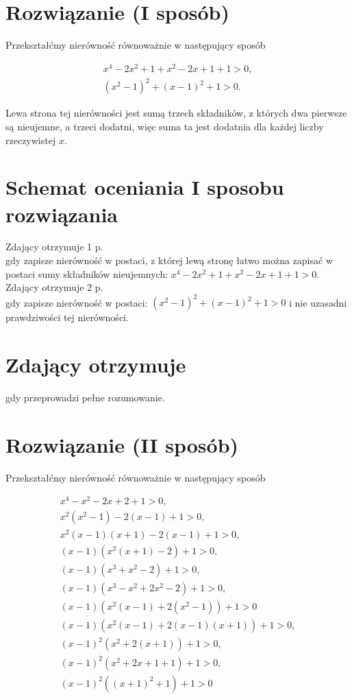 \documentclass[10pt]{article}
\begin{document}
\section*{Rozwiązanie (I sposób)}
Przekształćmy nierówność równoważnie w następujący sposób

$$
\begin{gathered}
x^{4}-2 x^{2}+1+x^{2}-2 x+1+1>0, \\
\left(x^{2}-1\right)^{2}+(x-1)^{2}+1>0 .
\end{gathered}
$$

Lewa strona tej nierówności jest sumą trzech składników, z których dwa pierwsze są nieujemne, a trzeci dodatni, więc suma ta jest dodatnia dla każdej liczby rzeczywistej $x$.

\section*{Schemat oceniania I sposobu rozwiązania}
Zdający otrzymuje 1 p.\\
gdy zapisze nierówność w postaci, z której lewą stronę łatwo można zapisać w postaci sumy składników nieujemnych: $x^{4}-2 x^{2}+1+x^{2}-2 x+1+1>0$.\\
Zdający otrzymuje 2 p.\\
gdy zapisze nierówność w postaci: $\left(x^{2}-1\right)^{2}+(x-1)^{2}+1>0$ i nie uzasadni prawdziwości tej nierówności.

\section*{Zdający otrzymuje}
gdy przeprowadzi pełne rozumowanie.

\section*{Rozwiązanie (II sposób)}
Przekształćmy nierówność równoważnie w następujący sposób

$$
\begin{gathered}
x^{4}-x^{2}-2 x+2+1>0, \\
x^{2}\left(x^{2}-1\right)-2(x-1)+1>0, \\
x^{2}(x-1)(x+1)-2(x-1)+1>0, \\
(x-1)\left(x^{2}(x+1)-2\right)+1>0, \\
(x-1)\left(x^{3}+x^{2}-2\right)+1>0, \\
(x-1)\left(x^{3}-x^{2}+2 x^{2}-2\right)+1>0, \\
(x-1)\left(x^{2}(x-1)+2\left(x^{2}-1\right)\right)+1>0 \\
(x-1)\left(x^{2}(x-1)+2(x-1)(x+1)\right)+1>0, \\
(x-1)^{2}\left(x^{2}+2(x+1)\right)+1>0, \\
(x-1)^{2}\left(x^{2}+2 x+1+1\right)+1>0, \\
(x-1)^{2}\left((x+1)^{2}+1\right)+1>0
\end{gathered}
$$
\end{document}
